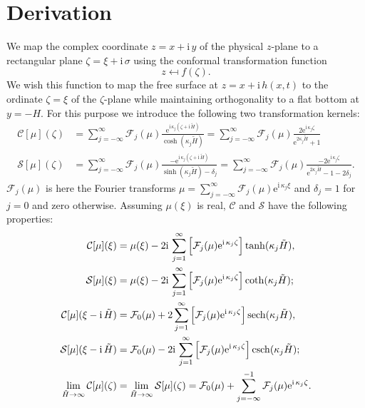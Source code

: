 \documentclass[a4paper,12pt]{article}
\newcommand{\mr}{\mathrm}
\newcommand{\mc}{\mathcal}
\newcommand{\ii}{\mr{i}\,}
\newcommand{\ee}{\mr{e}}
\renewcommand{\_}[1]{_\mr{#1}}
\let\Re\relax
\let\Im\relax
\DeclareMathOperator\Re{Re}
\DeclareMathOperator\Im{Im}
\newcommand{\z}{z}
\newcommand{\x}{x}
\newcommand{\y}{y}
\newcommand{\zz}{\zeta}
\newcommand{\xx}{\xi}
\newcommand{\yy}{\sigma}
\newcommand{\kk}{\kappa}
\newcommand{\zmap}{f}
\newcommand{\Hz}{H}
\newcommand{\Hzz}{\tilde H}
\newcommand{\hz}{h}
\newcommand{\Lsin}{\mc S}
\newcommand{\Lcos}{\mc C}
\newcommand{\FF}{\mc F}
\DeclareMathOperator{\sech}{sech}
\DeclareMathOperator{\csch}{csch}
\begin{document}
\section{Derivation}
We map the complex coordinate
$\z = \x+\ii\y$
of the physical $\z$-plane to a rectangular plane $\zz=\xx+\ii\yy$ using the conformal transformation function
\[\z\mapsfrom \zmap(\zz).\]
We wish this function to map the free surface at $\z=\x+\ii\hz(\x,t)$ to the ordinate $\zz=\xx$ of the $\zz$-plane while maintaining orthogonality to a flat bottom at $\y=-\Hz$.
For this purpose we introduce the following two transformation kernels:
\newcommand{\fun}{\mu}
\begin{subequations}
\begin{align}
\Lcos[\fun](\zz) &= \sum_{j=-\infty}^\infty \FF_j(\fun) \frac{\ee^{\ii \kk_j(\zz+\ii \Hzz)}}{\cosh(\kk_j\Hzz)} = \sum_{j=-\infty}^\infty \FF_j(\fun) \frac{2\ee^{\ii \kk_j \zz}}{\ee^{2\kk_j\Hzz}+1}\label{eq:Lcos}\\
\Lsin[\fun](\zz) &= \sum_{j=-\infty}^\infty \FF_j(\fun) \frac{-\ee^{\ii \kk_j(\zz+\ii \Hzz)}}{\sinh(\kk_j\Hzz)-\delta_j} = \sum_{j=-\infty}^\infty \FF_j(\fun) \frac{-2\ee^{\ii \kk_j \zz}}{\ee^{2\kk_j\Hzz}-1-2\delta_j}.\label{eq:Lsin}%
\end{align}%
\label{eq:L}%
\end{subequations}%
$\FF_j(\fun)$ is here the Fourier transforms $\fun=\sum_{j=-\infty}^\infty \FF_j(\fun)\ee^{\ii \kk_j \xx}$ and $\delta_j=1$ for $j=0$ and zero otherwise.
Assuming $\fun(\xx)$ is real, $\Lcos$ and $\Lsin $ have the following properties:
\begin{subequations}
\begin{align}
\Lcos[\fun](\xx) &= \fun(\xx)  -2\ii \sum_{j=1}^\infty \Im\Big[\FF_j(\fun) \ee^{\ii \kk_j\zz}\Big]\tanh(\kk_j\Hzz),\label{eq:LProps:C0}\\
\Lsin[\fun](\xx) &= \fun(\xx)  -2\ii \sum_{j=1}^\infty \Im\Big[\FF_j(\fun) \ee^{\ii \kk_j\zz}\Big]\coth(\kk_j\Hzz);\label{eq:LProps:S0}\\
\Lcos[\fun](\xx-\ii\Hzz) &= \FF_0(\fun)  +2    \sum_{j=1}^\infty \Re\Big[\FF_j(\fun) \ee^{\ii \kk_j\zz}\Big]\sech(\kk_j\Hzz),\label{eq:LProps:CH}\\
\Lsin[\fun](\xx-\ii\Hzz) &= \FF_0(\fun)  -2\ii \sum_{j=1}^\infty \Im\Big[\FF_j(\fun) \ee^{\ii \kk_j\zz}\Big]\csch(\kk_j\Hzz);\label{eq:LProps:SH}\\
\lim_{\Hzz\to\infty}\Lcos[\fun](\zz) &=\lim_{\Hzz\to\infty}\Lsin[\fun](\zz)= \FF_0(\fun) + \sum_{j=-\infty}^{-1} \FF_j(\fun) \ee^{\ii \kk_j \zz}.\label{eq:LProps:lim}
\end{align}%
\label{eq:LProps}%
\end{subequations}%
\end{document}
